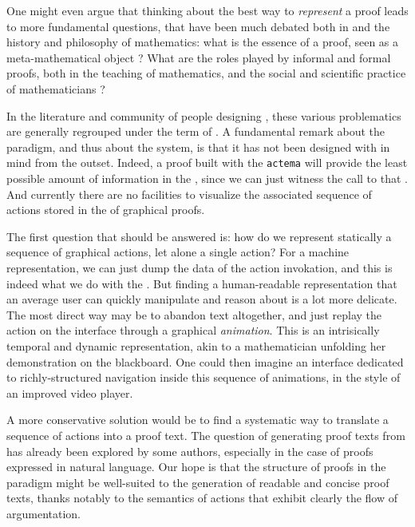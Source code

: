 \begin{digression}
One might even argue that thinking about the best way to \emph{represent} a
proof leads to more fundamental questions, that have been much debated both in
 and the history and philosophy of mathematics: what is the
essence of a proof, seen as a meta-mathematical object
\cite{strasburger-problem-2019}? What are the roles played by informal and
formal proofs, both in the teaching of mathematics, and the social and
scientific practice of mathematicians \cite{bartzia:hal-04087080}?
\end{digression}

In the literature and community of people designing , these
various problematics are generally regrouped under the term of . A fundamental remark about the  paradigm, and thus about the
 system, is that it has not been designed with  in mind from the outset. Indeed, a proof built with the
\texttt{actema}  will provide the least possible amount of information in
the , since we can just witness the call to that . And
currently there are no facilities to visualize the associated sequence of
actions stored in the  of graphical proofs.

The first question that should be answered is: how do we represent statically a
sequence of graphical actions, let alone a single action? For a machine
representation, we can just dump the data of the action invokation, and this is
indeed what we do with the . But finding a human-readable
representation that an average user can quickly manipulate and reason about is a
lot more delicate. The most direct way may be to abandon text altogether, and
just replay the action on the interface through a graphical \emph{animation}.
This is an intrisically temporal and dynamic representation, akin to a
mathematician unfolding her demonstration on the blackboard. One could then
imagine an interface dedicated to richly-structured navigation inside this
sequence of animations, in the style of an improved video player.

A more conservative solution would be to find a systematic way to translate a
sequence of actions into a proof text. The question of generating
 proof texts from   has already
been explored by some authors, especially in the case of proofs expressed in
natural language. Our hope is that the structure
of proofs in the  paradigm might be well-suited to the generation of
readable and concise proof texts, thanks notably to the 
semantics of  actions that exhibit clearly the flow of argumentation.

